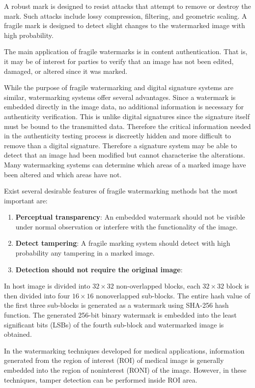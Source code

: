 \documentclass[runningheads]{llncs}
\begin{document}
A robust mark is designed to resist attacks that attempt to remove or destroy the mark. Such attacks include lossy compression, filtering, and geometric scaling. A fragile mark is designed to detect slight changes to the watermarked image with high probability.

The main application of fragile watermarks is in content authentication. That is, it may be of interest for parties to verify that an image has not been edited, damaged, or altered since it was marked.

While the purpose of fragile watermarking and digital signature systems are similar, watermarking systems offer several advantages. Since a watermark is embedded directly in the image data, no additional information is necessary for authenticity verification. This is unlike digital signatures
since the signature itself must be bound to the transmitted data. Therefore the critical information needed in the authenticity testing process is discreetly hidden and more difficult to remove than a digital signature. Therefore a signature system may be able to detect that an image had been modified but cannot characterise the alterations. Many watermarking systems can determine which areas of a marked image have been altered and which areas have not.

Exist several desirable features of fragile watermarking methods bat the most important are:

\begin{enumerate}
	\item \textbf{Perceptual transparency}: An embedded watermark should not be visible under normal observation or interfere	with the functionality of the image.
	\item \textbf{Detect tampering}: A fragile marking system should detect with high probability any tampering in a marked image.
	\item \textbf{Detection should not require the original image}:
\end{enumerate}

In \cite{gul2019novel} host image is divided into $32\times 32$ non-overlapped blocks, each $32\times 32$ block is then divided into four $16\times 16$ nonoverlapped sub-blocks. The entire hash value of the first three sub-blocks is generated as a watermark using SHA-256 hash function. The generated 256-bit binary watermark is embedded into the least significant bits (LSBs) of the fourth sub-block and watermarked image is obtained.

In the watermarking techniques developed for medical applications, information generated from the region of interest (ROI) of medical image is generally embedded into the region of noninterest (RONI) of the image. However, in these
techniques, tamper detection can be performed inside ROI area.
\end{document}
